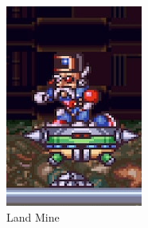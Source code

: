\begin{figure}[htp]
	\centering
	\begin{minipage}{.5\linewidth}
		\begin{subfigure}[t]{0.49\linewidth}
			\centering
			\includegraphics[width=\linewidth]{figures/X2/Hunter_stages/Serges_mines.png}
			\caption{Land Mine}	
		\end{subfigure}
		\begin{subfigure}[t]{0.49\linewidth}
			\centering

\end{subfigure}
\end{minipage}
\end{figure}
